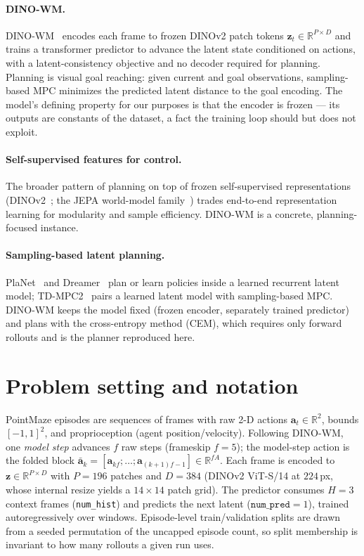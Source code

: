 \documentclass[11pt,a4paper]{article}
\newcommand{\zlat}{\mathbf{z}}
\newcommand{\act}{\mathbf{a}}
\newcommand{\abar}{\bar{\mathbf{a}}}
\begin{document}
\paragraph{DINO-WM.} DINO-WM~\cite{dinowm2025} encodes each frame to frozen
DINOv2 patch tokens $\zlat_t \in \mathbb{R}^{P\times D}$ and trains a
transformer predictor to advance the latent state conditioned on actions,
with a latent-consistency objective and no decoder required for planning.
Planning is visual goal reaching: given current and goal observations,
sampling-based MPC minimizes the predicted latent distance to the goal
encoding. The model's defining property for our purposes is that the encoder
is frozen --- its outputs are constants of the dataset, a fact the training
loop should but does not exploit.

\paragraph{Self-supervised features for control.} The broader pattern of
planning on top of frozen self-supervised representations
(DINOv2~\cite{dinov2}; the JEPA world-model family~\cite{vjepa2}) trades
end-to-end representation learning for modularity and sample efficiency.
DINO-WM is a concrete, planning-focused instance.

\paragraph{Sampling-based latent planning.} PlaNet~\cite{planet} and
Dreamer~\cite{dreamer} plan or learn policies inside a learned recurrent
latent model; TD-MPC2~\cite{tdmpc2} pairs a learned latent model with
sampling-based MPC. DINO-WM keeps the model fixed (frozen encoder, separately
trained predictor) and plans with the cross-entropy method (CEM), which
requires only forward rollouts and is the planner reproduced here.

\section{Problem setting and notation}
\label{sec:setting}

PointMaze episodes are sequences of frames with raw 2-D actions
$\act_t \in \mathbb{R}^{2}$, bounds $[-1,1]^2$, and proprioception (agent
position/velocity). Following DINO-WM, one \emph{model step} advances
$f$ raw steps (frameskip $f{=}5$); the model-step action is the folded block
$\abar_k = [\act_{kf};\dots;\act_{(k+1)f-1}] \in \mathbb{R}^{fA}$. Each frame
is encoded to $\zlat \in \mathbb{R}^{P\times D}$ with $P{=}196$ patches and
$D{=}384$ (DINOv2 ViT-S/14 at $224$\,px, whose internal resize yields a
$14\times14$ patch grid). The predictor consumes $H{=}3$ context frames
(\texttt{num\_hist}) and predicts the next latent ($\texttt{num\_pred}{=}1$),
trained autoregressively over windows. Episode-level train/validation splits
are drawn from a seeded permutation of the uncapped episode count, so split
membership is invariant to how many rollouts a given run uses.
\end{document}
